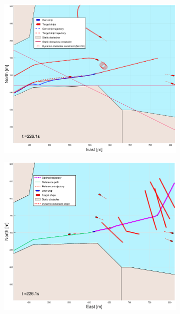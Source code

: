 \begin{figure}[ht]\ContinuedFloat
    \begin{subfigure}[b]{0.49\textwidth}
        \centering
        \includegraphics[width=\textwidth]{Images/Figures/Trheimfjord/_Simple_0fig1_time=226}
    \end{subfigure}
    \hfill
    \begin{subfigure}[b]{0.499\textwidth}
        \centering
        \includegraphics[width=\textwidth]{Images/Figures/Trheimfjord/_Simple_0fig999_time=226}

\end{subfigure}
\end{figure}
